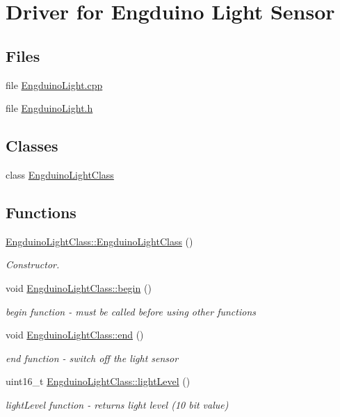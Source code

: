 \hypertarget{group___engduino_light}{}\section{Driver for Engduino Light Sensor}
\label{group___engduino_light}
\subsection*{Files}
\begin{DoxyCompactItemize}
\item 
file \hyperlink{_engduino_light_8cpp}{Engduino\+Light.\+cpp}
\item 
file \hyperlink{_engduino_light_8h}{Engduino\+Light.\+h}
\end{DoxyCompactItemize}
\subsection*{Classes}
\begin{DoxyCompactItemize}
\item 
class \hyperlink{class_engduino_light_class}{Engduino\+Light\+Class}
\end{DoxyCompactItemize}
\subsection*{Functions}
\begin{DoxyCompactItemize}
\item 
\hyperlink{group___engduino_light_ga865276a25a2d2934c9a12f91e61d2e39}{Engduino\+Light\+Class\+::\+Engduino\+Light\+Class} ()
\begin{DoxyCompactList}\small\item\em Constructor. \end{DoxyCompactList}\item 
void \hyperlink{group___engduino_light_gacbe1d008594ff191bf3e3605f02b3b45}{Engduino\+Light\+Class\+::begin} ()
\begin{DoxyCompactList}\small\item\em begin function -\/ must be called before using other functions \end{DoxyCompactList}\item 
void \hyperlink{group___engduino_light_ga967df93f0dbc15fe2dc352f4cf4baa13}{Engduino\+Light\+Class\+::end} ()
\begin{DoxyCompactList}\small\item\em end function -\/ switch off the light sensor \end{DoxyCompactList}\item 
uint16\+\_\+t \hyperlink{group___engduino_light_ga4ce4ac979e9b8987679edd085ea09ea9}{Engduino\+Light\+Class\+::light\+Level} ()
\begin{DoxyCompactList}\small\item\em light\+Level function -\/ returns light level (10 bit value) \end{DoxyCompactList}\end{DoxyCompactItemize}
